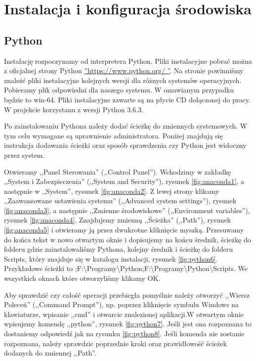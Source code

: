 \section{Instalacja i konfiguracja środowiska}
\label{sec:instalacja}

\subsection{Python}
\label{sec:anaconda}

Instalację rozpoczynamy od interpretera Python. Pliki instalacyjne pobrać można z oficjalnej strony Python \hyperref[python]{''https://www.python.org/ ''}. Na stronie powinniśmy znaleźć pliki instalacyjne kolejnych wersji dla różnych systemów operacyjnych. Pobieramy plik odpowiedni dla naszego systemu. W omawianym przypadku będzie to win-64. Pliki instalacyjne zawarte są na płycie CD dołączonej do pracy. W projekcie korzystanu z wersji Python 3.6.3.

Po zainstalowaniu Pythona należy dodać ścieżkę do zmiennych systemowych. W tym celu wymagane są uprawnienie administratora. Poniżej znajdują się instrukcja dodawania ścieżki oraz sposób sprawdzenia czy Python jest widoczny przez system.

Otwieramy ,,Panel Sterowania'' (,,Control Panel''). Wchodzimy w zakładkę ,,System i Zabezpieczenia'' (,,System and Security''), rysunek \ref{fig:anaconda1}, a następnie w ,,System'', rysunek \ref{fig:anaconda2}. Z lewej strony klikamy ,,Zaawansowane ustawienia systemu'' (,,Advanced system settings''), rysunek \ref{fig:anaconda3}, a następnie
,,Zmienne środowiskowe'' (,,Environment variables''), rysunek \ref{fig:anaconda4}. Znajdujemy zmienną ,,Ścieżka'' (,,Path''), rysunek \ref{fig:anaconda5} i otwieramy ją przez dwukrotne kliknięcie myszką. Przesuwamy do końca tekst w nowo otwartym oknie i dopisujemy na końcu średnik, ścieżkę do folderu gdzie zainstalowaliśmy Pythona, kolejny średnik i ścieżkę do folderu Scripts, który znajduje się w katalogu instalacji, rysunek \ref{fig:python6}. Przykładowe ścieżki to ;F:\textbackslash Programy\textbackslash Python;F:\textbackslash Programy\textbackslash Python\textbackslash Scripts. We wszystkich oknach które otworzyliśmy klikamy OK.

Aby sprawdzić czy całość operacji przebiegła pomyślnie należy otworzyć ,,Wiersz Poleceń'' (,,Command Prompt''), np. poprzez kliknięcie symbulu Windows na klawiaturze, wpisanie ,,cmd'' i otwarcie znalezionej aplikacji.W otwartym oknie wpisujemy komendę ,,python'', rysunek \ref{fig:python7}.  Jeśli jest ona rozpoznana to dostaniemy odpowiedź jak na rysunku \ref{fig:python8}. Jeśli komenda nie zostanie rozpoznana, należy sprawdzic poprzednie kroki oraz prawidłowość ścieżek dodanych do zmiennej ,,Path''.

